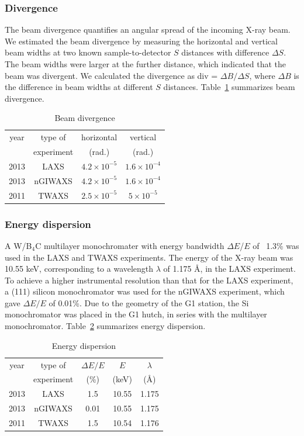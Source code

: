 \subsubsection{Divergence}
The beam divergence quantifies an angular spread of the incoming X-ray
beam. We estimated the beam divergence by measuring the horizontal and 
vertical beam widths at two known sample-to-detector $S$ distances
with difference $\Delta S$. 
The beam widths were larger at the further distance, which indicated 
that the beam was divergent. 
We calculated the divergence as div = $\Delta B/\Delta S$, where
$\Delta B$ is the difference in beam widths at different $S$ distances.
Table~\ref{tb:beam_divergence} summarizes beam divergence.

\begin{table}[htbp]
  \centering
  \begin{tabular}{cccc}
    \hline
    year & type of  & horizontal & vertical \\
     & experiment & (rad.) & (rad.) \\
    \hline
    2013 & LAXS & $4.2 \times 10^{-5}$ & $1.6 \times 10^{-4}$ \\
    2013 & nGIWAXS & $4.2 \times 10^{-5}$ & $1.6 \times 10^{-4}$ \\
    2011 & TWAXS & $2.5 \times 10^{-5}$ & $5 \times 10^{-5}$ \\
    \hline
  \end{tabular}
  \caption[Beam divergence]{Beam divergence}
  \label{tb:beam_divergence}
\end{table}

\subsubsection{Energy dispersion}
A W/B$_4$C multilayer monochromater with energy bandwidth $\Delta E$/$E$ of 
~1.3\% was used in the LAXS and TWAXS experiments. 
The energy of the X-ray beam was 10.55 keV, corresponding to a wavelength 
$\lambda$ of 1.175 \AA, in the LAXS experiment.
To achieve a higher instrumental resolution than that for 
the LAXS experiment, a (111) silicon monochromator was used for 
the nGIWAXS experiment, which gave $\Delta E/E$ of 0.01\%.
Due to the geometry of the G1 station, the Si monochromator was placed in
the G1 hutch, in series with the multilayer monochromator. 
Table~\ref{tb:energy_dispersion} summarizes energy dispersion.

\begin{table}[htbp]
  \centering
  \begin{tabular}{ccccc}
    \hline
    year & type of & $\Delta E/E$ & $E$ & $\lambda$ \\
     & experiment & (\%) & (keV) & (\AA) \\
    \hline
    2013 & LAXS & 1.5 & 10.55 & 1.175 \\
    2013 & nGIWAXS & 0.01 & 10.55 & 1.175 \\
    2011 & TWAXS & 1.5 & 10.54 & 1.176 \\
    \hline
  \end{tabular}
  \caption[Energy dispersion]{Energy dispersion}
  \label{tb:energy_dispersion}
\end{table}

